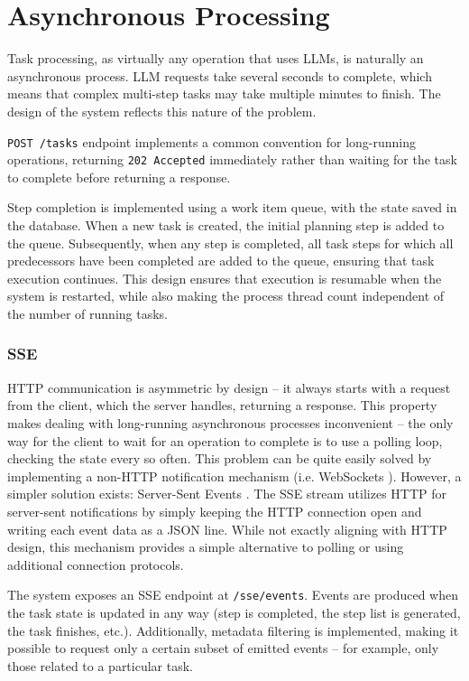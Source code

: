 \documentclass[a4paper,11pt,twoside]{report}
\theoremstyle{definition}
\begin{document}
\section{Asynchronous Processing}
\label{section:async-processing}

Task processing, as virtually any operation that uses LLMs, is naturally an asynchronous process. LLM requests take several seconds to complete, which means that complex multi-step tasks may take multiple minutes to finish. The design of the system reflects this nature of the problem.

\texttt{POST /tasks} endpoint implements a common convention for long-running operations, returning \texttt{202 Accepted} immediately rather than waiting for the task to complete before returning a response. 

Step completion is implemented using a work item queue, with the state saved in the database. When a new task is created, the initial planning step is added to the queue. Subsequently, when any step is completed, all task steps for which all predecessors have been completed are added to the queue, ensuring that task execution continues. This design ensures that execution is resumable when the system is restarted, while also making the process thread count independent of the number of running tasks.

\subsubsection{SSE}

HTTP communication is asymmetric by design -- it always starts with a request from the client, which the server handles, returning a response. This property makes dealing with long-running asynchronous processes inconvenient -- the only way for the client to wait for an operation to complete is to use a polling loop, checking the state every so often. This problem can be quite easily solved by implementing a non-HTTP notification mechanism (i.e. WebSockets \cite{fette2011websocket}). However, a simpler solution exists: Server-Sent Events \cite{w3c2015sse}. The SSE stream utilizes HTTP for server-sent notifications by simply keeping the HTTP connection open and writing each event data as a JSON line. While not exactly aligning with HTTP design, this mechanism provides a simple alternative to polling or using additional connection protocols.

The system exposes an SSE endpoint at \texttt{/sse/events}. Events are produced when the task state is updated in any way (step is completed, the step list is generated, the task finishes, etc.). Additionally, metadata filtering is implemented, making it possible to request only a certain subset of emitted events -- for example, only those related to a particular task.
\end{document}
